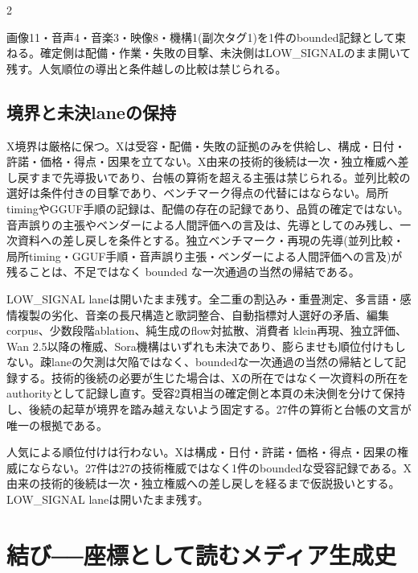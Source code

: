 \documentclass[lualatex,a4paper,10pt]{jlreq}
\begin{document}
\begin{multicols}{2}
\begin{themeoverview}[受容27件の見取り図]
画像11・音声4・音楽3・映像8・機構1(副次タグ1)を1件のbounded記録として束ねる。確定側は配備・作業・失敗の目撃、未決側はLOW\_SIGNALのまま開いて残す。人気順位の導出と条件越しの比較は禁じられる。
\end{themeoverview}
\autocite{btd139}

\subsection{境界と未決laneの保持}
X境界は厳格に保つ。Xは受容・配備・失敗の証拠のみを供給し、構成・日付・許諾・価格・得点・因果を立てない\autocite{btd139}。X由来の技術的後続は一次・独立権威へ差し戻すまで先導扱いであり、台帳の算術を超える主張は禁じられる。並列比較の選好は条件付きの目撃であり、ベンチマーク得点の代替にはならない。局所timingやGGUF手順の記録は、配備の存在の記録であり、品質の確定ではない。音声誤りの主張やベンダーによる人間評価への言及は、先導としてのみ残し、一次資料への差し戻しを条件とする\autocite{btd139}。独立ベンチマーク・再現の先導(並列比較・局所timing・GGUF手順・音声誤り主張・ベンダーによる人間評価への言及)が残ることは、不足ではなく bounded な一次通過の当然の帰結である。

LOW\_SIGNAL laneは開いたまま残す。全二重の割込み・重畳測定、多言語・感情複製の劣化、音楽の長尺構造と歌詞整合、自動指標対人選好の矛盾、編集corpus、少数段階ablation、純生成のflow対拡散、消費者 klein再現、独立評価、Wan 2.5以降の権威、Sora機構はいずれも未決であり、膨らませも順位付けもしない。疎laneの欠測は欠陥ではなく、boundedな一次通過の当然の帰結として記録する。技術的後続の必要が生じた場合は、Xの所在ではなく一次資料の所在をauthorityとして記録し直す。受容2頁相当の確定側と本頁の未決側を分けて保持し、後続の起草が境界を踏み越えないよう固定する。27件の算術と台帳の文言が唯一の根拠である\autocite{btd139}。
\end{multicols}

\begin{claimboundary}[本節の読解上の境界]
人気による順位付けは行わない。Xは構成・日付・許諾・価格・得点・因果の権威にならない。27件は27の技術権威ではなく1件のboundedな受容記録である。X由来の技術的後続は一次・独立権威への差し戻しを経るまで仮説扱いとする。LOW\_SIGNAL laneは開いたまま残す。
\end{claimboundary}

\section{結び──座標として読むメディア生成史}
\label{sec:synthesis}
\end{document}
